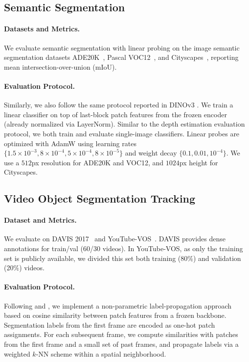 \documentclass[]{fairmeta}
\begin{document}
\subsection{Semantic Segmentation}

\paragraph{\bf Datasets and Metrics.} We evaluate semantic segmentation with linear probing on the image semantic segmentation datasets ADE20K~\citep{zhou2017ade20k}, Pascal VOC12~\citep{everingham2015pascal}, and Cityscapes~\citep{cordts2016cityscapes}, reporting mean intersection-over-union (mIoU).

\paragraph{\bf Evaluation Protocol.} Similarly, we also follow the same protocol reported in DINOv3 \cite{simeoni2025dinov3}.
We train a linear classifier on top of last-block patch features from the frozen encoder (already normalized via LayerNorm).
Similar to the depth estimation evaluation protocol, we both train and evaluate single-image classifiers.
Linear probes are optimized with AdamW using learning rates 
$\{1.5\!\times\!10^{-3}, 8\!\times\!10^{-4}, 5\!\times\!10^{-4}, 8\!\times\!10^{-5}\}$ and weight decay  $\{0.1, 0.01, 10^{-4}\}$.
We use a $512$px resolution for ADE20K and VOC12, and $1024$px height for Cityscapes.

\subsection{Video Object Segmentation Tracking}

\paragraph{\bf Dataset and Metrics.} We evaluate on DAVIS 2017~\citep{pont20172017} and YouTube-VOS~\citep{xu2018youtube}. DAVIS provides dense annotations for train/val (60/30 videos). In YouTube-VOS, as only the training set is publicly available, we divided this set both training (80$\%$) and validation (20$\%$) videos.

\paragraph{\bf Evaluation Protocol.}
Following \citep{rajasegaran2025empirical} and \cite{simeoni2025dinov3}, we implement a non-parametric label-propagation approach based on cosine similarity between patch features from a frozen backbone. 
Segmentation labels from the first frame are encoded as one-hot patch assignments. For each subsequent frame, we compute similarities with patches from the first frame and a small set of past frames, and propagate labels via a weighted $k$-NN scheme within a spatial neighborhood. 
\end{document}
